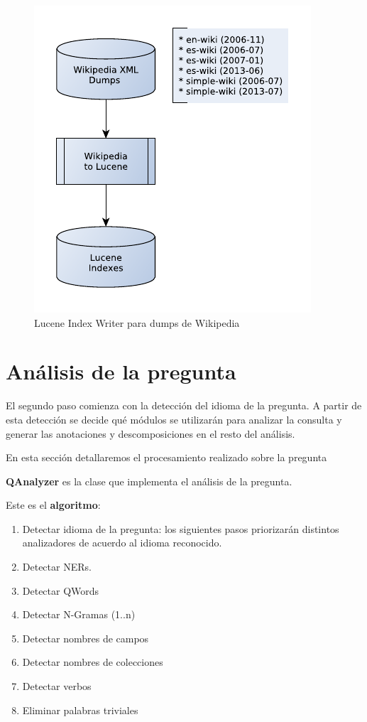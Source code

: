 \begin{figure}
  \centering
    \includegraphics{graficos/LuceneIndexWriterWiki}
  \caption{Lucene Index Writer para dumps de Wikipedia}
  \label{fig:LuceneIndexWriterWiki}
\end{figure}


\bigskip

\section{An\'alisis de la pregunta}

El segundo paso comienza con la detecci\'on del idioma de la pregunta. A
partir de esta detecci\'on se decide qu\'e m\'odulos se utilizar\'an
para analizar la consulta y generar las anotaciones y descomposiciones
en el resto del an\'alisis.

En esta secci\'on detallaremos el procesamiento realizado sobre la
pregunta


\bigskip

\textbf{QAnalyzer} es la clase que implementa el an\'alisis de la
pregunta.

Este es el\textbf{ algoritmo}:


\begin{enumerate}
\item Detectar idioma de la pregunta: los siguientes pasos priorizar\'an
distintos analizadores de acuerdo al idioma reconocido. 
\item Detectar NERs. 
\item Detectar QWords
\item Detectar N-Gramas (1..n)
\item Detectar nombres de campos
\item Detectar nombres de colecciones
\item Detectar verbos
\item Eliminar palabras triviales
\end{enumerate}

